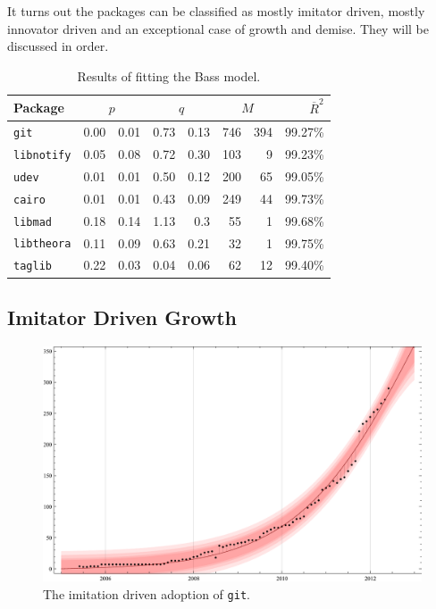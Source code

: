 \documentclass[smallextended,final]{svjour3}
\begin{document}
It turns out the packages can be classified as mostly imitator driven, mostly innovator driven and an exceptional case of growth and demise. They will be discussed in order.

\begin{table}
\small\centering
\caption{Results of fitting the Bass model.}\label{tbl:results}
\begin{tabular}{lr@{ $\pm$}rr@{ $\pm$}rr@{ $\pm$}rr}
\toprule
Package & \multicolumn{2}{c}{$p$} & \multicolumn{2}{c}{$q$} & \multicolumn{2}{c}{$M$} & $\overline{R}^2$\\
\midrule
\texttt{git}         & 0.00 & 0.01    & 0.73 & 0.13   & 746 & 394 & 99.27\%\\
\texttt{libnotify}   & 0.05 & 0.08    & 0.72 & 0.30   & 103 &   9 & 99.23\%\\
\texttt{udev}        & 0.01 & 0.01    & 0.50 & 0.12   & 200 &  65 & 99.05\%\\
\texttt{cairo}       & 0.01 & 0.01    & 0.43 & 0.09   & 249 &  44 & 99.73\%\\
\texttt{libmad}      & 0.18 & 0.14    & 1.13 & 0.3    &  55 &   1 & 99.68\%\\
\texttt{libtheora}   & 0.11 & 0.09    & 0.63 & 0.21   &  32 &   1 & 99.75\%\\
\texttt{taglib}      & 0.22 & 0.03    & 0.04 & 0.06   &  62 &  12 & 99.40\%\\
\bottomrule
\end{tabular}
\end{table}

\subsection{Imitator Driven Growth}

\begin{figure}
\small\centering
\includegraphics[width=\linewidth]{BassFit-git2.pdf}
\caption{The imitation driven adoption of \texttt{git}.}\label{fig:git}
\vspace{-1em}
\end{figure}
\end{document}
